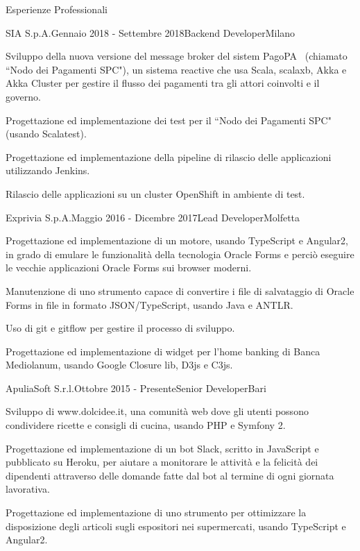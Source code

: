 \documentclass{resume} %
\begin{document}
\begin{rSection}{Esperienze Professionali}

\begin{rSubsection}{SIA S.p.A.}{Gennaio 2018 - Settembre 2018}{Backend Developer}{Milano}
\item Sviluppo della nuova versione del message broker del sistem PagoPA\textregistered~ (chiamato ``Nodo dei Pagamenti SPC"),
un sistema reactive che usa Scala, scalaxb, Akka e Akka Cluster per gestire il flusso dei pagamenti tra gli attori coinvolti e il governo.
\item Progettazione ed implementazione dei test per il ``Nodo dei Pagamenti SPC" (usando Scalatest).
\item Progettazione ed implementazione della pipeline di rilascio delle applicazioni utilizzando Jenkins.
\item Rilascio delle applicazioni su un cluster OpenShift in ambiente di test.
\end{rSubsection}


\begin{rSubsection}{Exprivia S.p.A.}{Maggio 2016 - Dicembre 2017}{Lead Developer}{Molfetta}
\item Progettazione ed implementazione di un motore, usando TypeScript e Angular2,
in grado di emulare le funzionalit\`a della tecnologia Oracle Forms e perci\`o eseguire le vecchie applicazioni Oracle Forms sui browser moderni.
\item Manutenzione di uno strumento capace di convertire i file di salvataggio di Oracle Forms in file in formato JSON/TypeScript, usando Java e ANTLR.
\item Uso di git e gitflow per gestire il processo di sviluppo.
\item Progettazione ed implementazione di widget per l'home banking di Banca Mediolanum, usando Google Closure lib, D3js e C3js.
\end{rSubsection}


\begin{rSubsection}{ApuliaSoft S.r.l.}{Ottobre 2015 - Presente}{Senior Developer}{Bari}
\item Sviluppo di www.dolcidee.it, una comunit\`a web dove gli utenti possono condividere ricette e consigli di cucina, usando PHP e Symfony 2.
\item Progettazione ed implementazione di un bot Slack, scritto in JavaScript e pubblicato su Heroku, per aiutare a monitorare le attivit\`a e
la felicit\`a dei dipendenti attraverso delle domande fatte dal bot al termine di ogni giornata lavorativa.
\item Progettazione ed implementazione di uno strumento per ottimizzare la disposizione degli articoli sugli espositori nei supermercati, usando TypeScript e Angular2.
\end{rSubsection}


\end{rSection}
\end{document}
